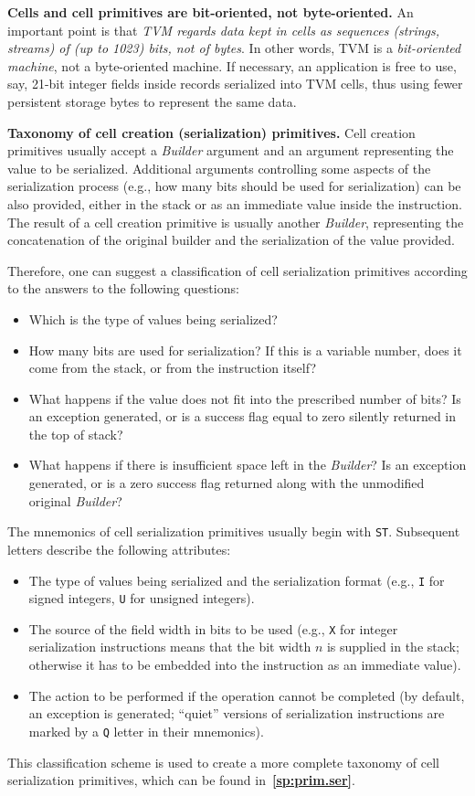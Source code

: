 \documentclass[12pt,oneside]{article}
\def\makepoint#1{\medbreak\noindent{\bf #1.\ }}
\def\nxsubpoint{\refstepcounter{subsubsection}%
  \smallbreak\makepoint{\thesubsubsection}}
\def\refpoint#1{{\rm\textbf{\ref{#1}}}}
\let\ptref=\refpoint
\def\emb#1{\textbf{#1.}}
\begin{document}
\nxsubpoint\label{sp:cells.of.bits}
\emb{Cells and cell primitives are bit-oriented, not byte-oriented}
An important point is that {\em TVM regards data kept in cells as sequences (strings, streams) of (up to 1023) bits, not of bytes}. In other words, TVM is a {\em bit-oriented machine}, not a byte-oriented machine. If necessary, an application is free to use, say, 21-bit integer fields inside records serialized into TVM cells, thus using fewer persistent storage bytes to represent the same data.

\nxsubpoint\label{sp:cc.taxonomy}
\emb{Taxonomy of cell creation (serialization) primitives}
Cell creation primitives usually accept a {\em Builder\/} argument and an argument representing the value to be serialized. Additional arguments controlling some aspects of the serialization process (e.g., how many bits should be used for serialization) can be also provided, either in the stack or as an immediate value inside the instruction. The result of a cell creation primitive is usually another {\em Builder}, representing the concatenation of the original builder and the serialization of the value provided.

Therefore, one can suggest a classification of cell serialization primitives according to the answers to the following questions:
\begin{itemize}
\item Which is the type of values being serialized?
\item How many bits are used for serialization? If this is a variable number, does it come from the stack, or from the instruction itself?
\item What happens if the value does not fit into the prescribed number of bits? Is an exception generated, or is a success flag equal to zero silently returned in the top of stack?
\item What happens if there is insufficient space left in the {\em Builder}? Is an exception generated, or is a zero success flag returned along with the unmodified original {\em Builder}?
\end{itemize}
The mnemonics of cell serialization primitives usually begin with \texttt{ST}. Subsequent letters describe the following attributes:
\begin{itemize}
\item The type of values being serialized and the serialization format (e.g., \texttt{I} for signed integers, \texttt{U} for unsigned integers).
\item The source of the field width in bits to be used (e.g., \texttt{X} for integer serialization instructions means that the bit width $n$ is supplied in the stack; otherwise it has to be embedded into the instruction as an immediate value).
\item The action to be performed if the operation cannot be completed (by default, an exception is generated; ``quiet'' versions of serialization instructions are marked by a \texttt{Q} letter in their mnemonics).
\end{itemize}
This classification scheme is used to create a more complete taxonomy of cell serialization primitives, which can be found in~\ptref{sp:prim.ser}.
\end{document}
